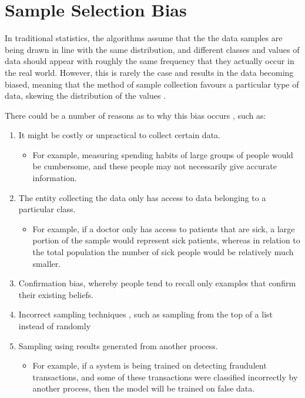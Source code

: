 \chapter[Sample Selection Bias]{Sample Selection Bias}
\label{ch:sample-selection-bias}

    In traditional statistics, the algorithms assume that the the data samples are being drawn in line with the same distribution, and different classes and values of data should appear with roughly the same frequency that they actually occur in the real world. However, this is rarely the case and results in the data becoming biased, meaning that the method of sample collection favours a particular type of data, skewing the distribution of the values \citep{CuddebackEtAl2004}.

    There could be a number of reasons as to why this bias occurs \citep{Tommasi2017}, such as:

    \begin{enumerate}
        \item It might be costly or unpractical to collect certain data.
        \begin{itemize}
        	\item For example, measuring spending habits of large groups of people would be cumbersome, and these people may not necessarily give accurate information.
        \end{itemize}
        \item The entity collecting the data only has access to data belonging to a particular class.
        \begin{itemize}
        	\item For example, if a doctor only has access to patients that are sick, a large portion of the sample would represent sick patients, whereas in relation to the total population the number of sick people would be relatively much smaller.
		\end{itemize}        
        \item Confirmation bias, whereby people tend to recall only examples that confirm their existing beliefs.
        \item Incorrect sampling techniques \citep{Marshall1996}, such as sampling from the top of a list instead of randomly
        \item Sampling using results generated from another process.
        \begin{itemize}
        	\item For example, if a system is being trained on detecting fraudulent transactions, and some of these transactions were classified incorrectly by another process, then the model will be trained on false data.   
   		\end{itemize}
    \end{enumerate} 
    
